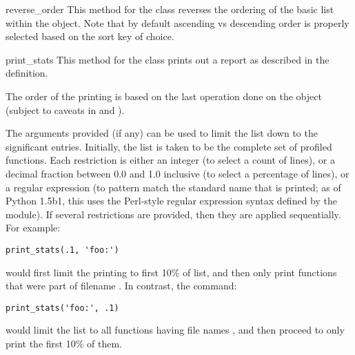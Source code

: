 \begin{methoddesc}[Stats]{reverse_order}{}
This method for the  class reverses the ordering of the basic
list within the object.  %
Note that by default ascending vs descending order is properly selected
based on the sort key of choice.
\end{methoddesc}

\begin{methoddesc}[Stats]{print_stats}{}
This method for the  class prints out a report as described
in the  definition.

The order of the printing is based on the last 
operation done on the object (subject to caveats in  and
).

The arguments provided (if any) can be used to limit the list down to
the significant entries.  Initially, the list is taken to be the
complete set of profiled functions.  Each restriction is either an
integer (to select a count of lines), or a decimal fraction between
0.0 and 1.0 inclusive (to select a percentage of lines), or a regular
expression (to pattern match the standard name that is printed; as of
Python 1.5b1, this uses the Perl-style regular expression syntax
defined by the  module).  If several restrictions are
provided, then they are applied sequentially.  For example:

\begin{verbatim}
print_stats(.1, 'foo:')
\end{verbatim}

would first limit the printing to first 10\% of list, and then only
print functions that were part of filename .  In
contrast, the command:

\begin{verbatim}
print_stats('foo:', .1)
\end{verbatim}

would limit the list to all functions having file names ,
and then proceed to only print the first 10\% of them.
\end{methoddesc}


